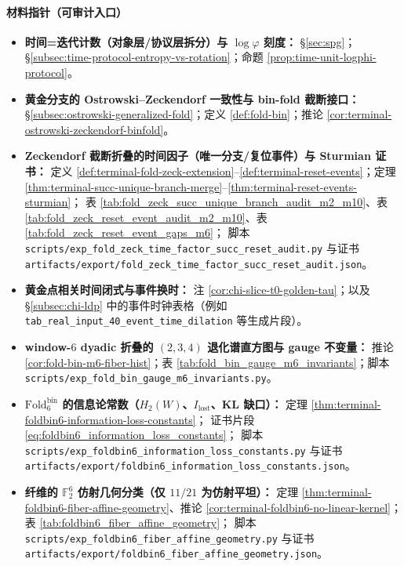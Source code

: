 \paragraph{材料指针（可审计入口）}
\begin{itemize}
  \item \textbf{时间=迭代计数（对象层/协议层拆分）与 \(\log\varphi\) 刻度：}
  \S\ref{sec:spg}；\S\ref{subsec:time-protocol-entropy-vs-rotation}；命题 \ref{prop:time-unit-logphi-protocol}。
  \item \textbf{黄金分支的 Ostrowski--Zeckendorf 一致性与 bin-fold 截断接口：}
  \S\ref{subsec:ostrowski-generalized-fold}；定义 \ref{def:fold-bin}；推论 \ref{cor:terminal-ostrowski-zeckendorf-binfold}。
  \item \textbf{Zeckendorf 截断折叠的时间因子（唯一分支/复位事件）与 Sturmian 证书：}
  定义 \ref{def:terminal-fold-zeck-extension}--\ref{def:terminal-reset-events}；定理 \ref{thm:terminal-succ-unique-branch-merge}--\ref{thm:terminal-reset-events-sturmian}；
  表 \ref{tab:fold_zeck_succ_unique_branch_audit_m2_m10}、表 \ref{tab:fold_zeck_reset_event_audit_m2_m10}、表 \ref{tab:fold_zeck_reset_event_gaps_m6}；
  脚本 \texttt{scripts/exp\_fold\_zeck\_time\_factor\_succ\_reset\_audit.py} 与证书 \texttt{artifacts/export/fold\_zeck\_time\_factor\_succ\_reset\_audit.json}。
  \item \textbf{黄金点相关时间闭式与事件换时：}
  注 \ref{cor:chi-slice-t0-golden-tau}；以及 \S\ref{subsec:chi-ldp} 中的事件时钟表格（例如 \texttt{tab\_real\_input\_40\_event\_time\_dilation} 等生成片段）。
  \item \textbf{window-\(6\) dyadic 折叠的 \((2,3,4)\) 退化谱直方图与 gauge 不变量：}
  推论 \ref{cor:fold-bin-m6-fiber-hist}；表 \ref{tab:fold_bin_gauge_m6_invariants}；脚本 \texttt{scripts/exp\_fold\_bin\_gauge\_m6\_invariants.py}。
  \item \textbf{\(\mathrm{Fold}^{\mathrm{bin}}_6\) 的信息论常数（\(H_2(W)\)、\(I_{\mathrm{lost}}\)、KL 缺口）：}
  定理 \ref{thm:terminal-foldbin6-information-loss-constants}；
  证书片段 \eqref{eq:foldbin6_information_loss_constants}；
  脚本 \texttt{scripts/exp\_foldbin6\_information\_loss\_constants.py} 与证书 \texttt{artifacts/export/foldbin6\_information\_loss\_constants.json}。
  \item \textbf{纤维的 \(\mathbb{F}_2^6\) 仿射几何分类（仅 \(11/21\) 为仿射平坦）：}
  定理 \ref{thm:terminal-foldbin6-fiber-affine-geometry}、推论 \ref{cor:terminal-foldbin6-no-linear-kernel}；
  表 \ref{tab:foldbin6_fiber_affine_geometry}；
  脚本 \texttt{scripts/exp\_foldbin6\_fiber\_affine\_geometry.py} 与证书 \texttt{artifacts/export/foldbin6\_fiber\_affine\_geometry.json}。

\end{itemize}

